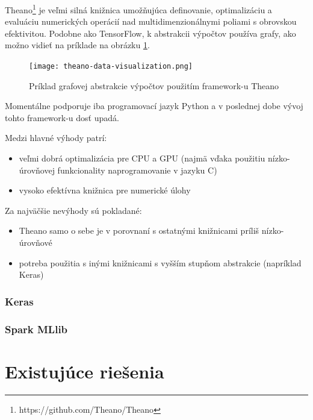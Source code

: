 Theano\footnote{https://github.com/Theano/Theano} je veľmi silná knižnica umožňujúca definovanie, optimalizáciu a evaluáciu numerických operácií nad multidimenzionálnymi poliami s obrovskou efektivitou. Podobne ako TensorFlow, k abstrakcii výpočtov používa grafy, ako možno vidieť na príklade na obrázku \ref{theano_image}.


\begin{figure}[H]
	\begin{center}\texttt{[image: theano-data-visualization.png]}
		\caption[Príklad grafovej abstrakcie výpočtov použitím framework-u Theano]{
			Príklad grafovej abstrakcie výpočtov použitím framework-u Theano\footnotemark
		}\label{theano_image}
	\end{center}
\end{figure}

Momentálne podporuje iba programovací jazyk Python a v poslednej dobe vývoj tohto framework-u dosť upadá.

Medzi hlavné výhody patrí:
\begin{itemize}
	\item veľmi dobrá optimalizácia pre CPU a GPU (najmä vďaka použitiu nízko-úrovňovej funkcionality naprogramovanie v jazyku C)
	\item vysoko efektívna knižnica pre numerické úlohy
\end{itemize}

Za najväčšie nevýhody sú pokladané:
\begin{itemize}
	\item Theano samo o sebe je v porovnaní s ostatnými knižnicami príliš nízko-úrovňové
	\item potreba použitia s inými knižnicami s vyšším stupňom abstrakcie (napríklad Keras) 
\end{itemize}

\subsubsection{Keras}\label{keras}

\subsubsection{Spark MLlib}

\section{Existujúce riešenia}

